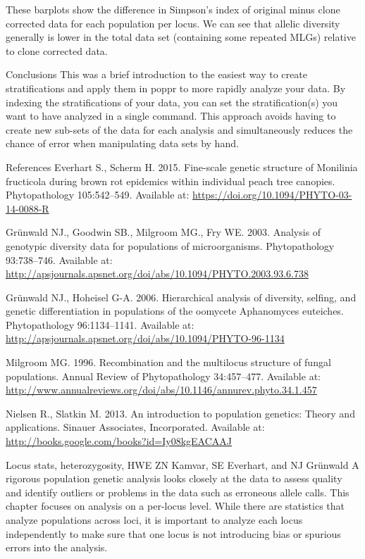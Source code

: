 \documentclass[12pt,]{krantz}
\theoremstyle{definition}
\theoremstyle{definition}
\theoremstyle{definition}
\theoremstyle{remark}
\begin{document}
These barplots show the difference in Simpson's index of original minus
clone corrected data for each population per locus. We can see that
allelic diversity generally is lower in the total data set (containing
some repeated MLGs) relative to clone corrected data.

Conclusions This was a brief introduction to the easiest way to create
stratifications and apply them in poppr to more rapidly analyze your
data. By indexing the stratifications of your data, you can set the
stratification(s) you want to have analyzed in a single command. This
approach avoids having to create new sub-sets of the data for each
analysis and simultaneously reduces the chance of error when
manipulating data sets by hand.

References Everhart S., Scherm H. 2015. Fine-scale genetic structure of
Monilinia fructicola during brown rot epidemics within individual peach
tree canopies. Phytopathology 105:542--549. Available at:
\url{https://doi.org/10.1094/PHYTO-03-14-0088-R}

Grünwald NJ., Goodwin SB., Milgroom MG., Fry WE. 2003. Analysis of
genotypic diversity data for populations of microorganisms.
Phytopathology 93:738--746. Available at:
\url{http://apsjournals.apsnet.org/doi/abs/10.1094/PHYTO.2003.93.6.738}

Grünwald NJ., Hoheisel G-A. 2006. Hierarchical analysis of diversity,
selfing, and genetic differentiation in populations of the oomycete
Aphanomyces euteiches. Phytopathology 96:1134--1141. Available at:
\url{http://apsjournals.apsnet.org/doi/abs/10.1094/PHYTO-96-1134}

Milgroom MG. 1996. Recombination and the multilocus structure of fungal
populations. Annual Review of Phytopathology 34:457--477. Available at:
\url{http://www.annualreviews.org/doi/abs/10.1146/annurev.phyto.34.1.457}

Nielsen R., Slatkin M. 2013. An introduction to population genetics:
Theory and applications. Sinauer Associates, Incorporated. Available at:
\url{http://books.google.com/books?id=Iy08kgEACAAJ}

Locus stats, heterozygosity, HWE ZN Kamvar, SE Everhart, and NJ Grünwald
A rigorous population genetic analysis looks closely at the data to
assess quality and identify outliers or problems in the data such as
erroneous allele calls. This chapter focuses on analysis on a per-locus
level. While there are statistics that analyze populations across loci,
it is important to analyze each locus independently to make sure that
one locus is not introducing bias or spurious errors into the analysis.
\end{document}
